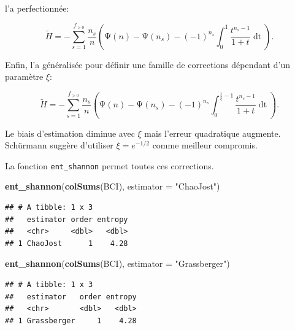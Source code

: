\documentclass[
  11pt,
  american,
  a4paper,
  extrafontsizes,onecolumn,openright
  ]{memoir}
\newenvironment{Shaded}{\begin{snugshade}}{\end{snugshade}}
\newcommand{\AttributeTok}[1]{\textcolor[rgb]{0.13,0.29,0.53}{#1}}
\newcommand{\FunctionTok}[1]{\textcolor[rgb]{0.13,0.29,0.53}{\textbf{#1}}}
\newcommand{\NormalTok}[1]{#1}
\newcommand{\StringTok}[1]{\textcolor[rgb]{0.31,0.60,0.02}{#1}}
\newlength{\rf}
\begin{document}
\textcite{Grassberger2003} l'a perfectionnée:

\begin{equation}
  \label{eq:Grassberger2003}
  \tilde{H} 
  = -\sum^{f_{>0}}_{s=1}{
    \frac{n_s}{n} \left( \mathrm{\Psi}\left( n \right) - \mathrm{\Psi}\left( n_s \right)
    -{\left( -1 \right)}^{n_s} \int^1_0{\frac{t^{n_s - 1}}{1 + t} \mathop{dt}} \right)
  }.
\end{equation}

Enfin, \textcite{Schurmann2004} l'a généralisée pour définir une famille de corrections dépendant d'un paramètre \(\xi\):

\begin{equation}
  \label{eq:Schurmann2004}
  \tilde{H} 
  = -\sum^{f_{>0}}_{s=1}{
    \frac{n_s}{n} \left( \mathrm{\Psi}\left( n \right) - \mathrm{\Psi}\left( n_s \right) 
    - {\left( -1 \right)}^{n_s} \int^{\frac{1}{\xi} - 1}_0{\frac{t^{n_s - 1}}{1 + t} \mathop{dt}} \right)
  }.
\end{equation}

Le biais d'estimation diminue avec \(\xi\) mais l'erreur quadratique augmente.
Schürmann suggère d'utiliser \(\xi=e^{-1/2}\) comme meilleur compromis.

La fonction \texttt{ent\_shannon} permet toutes ces corrections.

\scriptsize

\begin{Shaded}
\begin{Highlighting}[]
\FunctionTok{ent\_shannon}\NormalTok{(}\FunctionTok{colSums}\NormalTok{(BCI), }\AttributeTok{estimator =} \StringTok{"ChaoJost"}\NormalTok{)}
\end{Highlighting}
\end{Shaded}

\begin{verbatim}
## # A tibble: 1 x 3
##   estimator order entropy
##   <chr>     <dbl>   <dbl>
## 1 ChaoJost      1    4.28
\end{verbatim}

\begin{Shaded}
\begin{Highlighting}[]
\FunctionTok{ent\_shannon}\NormalTok{(}\FunctionTok{colSums}\NormalTok{(BCI), }\AttributeTok{estimator =} \StringTok{"Grassberger"}\NormalTok{)}
\end{Highlighting}
\end{Shaded}

\begin{verbatim}
## # A tibble: 1 x 3
##   estimator   order entropy
##   <chr>       <dbl>   <dbl>
## 1 Grassberger     1    4.28
\end{verbatim}
\end{document}
